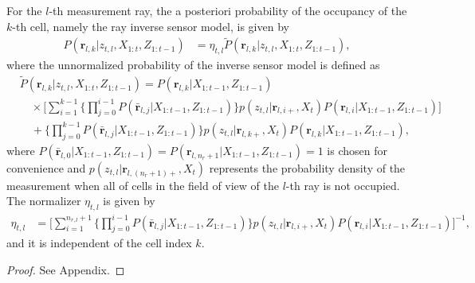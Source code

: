\begin{prop}
For the $l$-th measurement ray, the a posteriori probability of the occupancy of the $k$-th cell, namely the ray inverse sensor model, is given by
\begin{align}
\label{eqn:RayISMAnswer}
P(\mathbf{r}_{l,k}|z_{t,l},X_{1:t},Z_{1:t-1})&=\eta_{t,l}\tilde P(\mathbf{r}_{l,k}|z_{t,l},X_{1:t},Z_{1:t-1}),
\end{align}
where the unnormalized probability of the inverse sensor model is defined as
\begin{align}
\label{eqn:Unnormalized}
& \tilde P(\mathbf{r}_{l,k}|z_{t,l},X_{1:t},Z_{1:t-1})%
=P(\mathbf{r}_{l,k}|X_{1:t-1},Z_{1:t-1})\nonumber\\
&\quad\times 
\bigg[\sum_{i=1}^{k-1}\bigg\{\prod_{j=0}^{i-1}P(\bar{\mathbf{r}}_{l,j}|X_{1:t-1},Z_{1:t-1})\bigg\}%
p(z_{t,l}|\mathbf{r}_{l,i+},X_t)P(\mathbf{r}_{l,i}|X_{1:t-1},Z_{1:t-1})\bigg]\nonumber\\
&\quad + \bigg\{\prod_{j=0}^{k-1}P(\bar{\mathbf{r}}_{l,j}|X_{1:t-1},Z_{1:t-1})\bigg\}%
p(z_{t,l}|\mathbf{r}_{l,k+},X_t)P(\mathbf{r}_{l,k}|X_{1:t-1},Z_{1:t-1}),
\end{align}
where $P(\bar{\mathbf{r}}_{l,0}|X_{1:t-1},Z_{1:t-1})=P(\mathbf{r}_{l,n_r+1}|X_{1:t-1},Z_{1:t-1})=1$ is chosen for convenience and $p(z_{t,l}|\mathbf{r}_{l,(n_r+1)+},X_t)$ represents the probability density of the measurement when all of cells in the field of view of the $l$-th ray is not occupied. The normalizer $\eta_{t,l}$ is given by
\begin{align}
\label{eqn:allEta}
\eta_{t,l}
&=
\bigg[\sum_{i=1}^{n_{r,l}+1}\bigg\{\prod_{j=0}^{i-1}P(\bar{\mathbf{r}}_{l,j}|X_{1:t-1},Z_{1:t-1})\bigg\}p(z_{t,l}|\mathbf{r}_{l,i+},X_t)P(\mathbf{r}_{l,i}|X_{1:t-1},Z_{1:t-1})\bigg]^{-1},
\end{align}
and it is independent of the cell index $k$.
\end{prop}
\begin{proof}%
See Appendix.
\end{proof}


